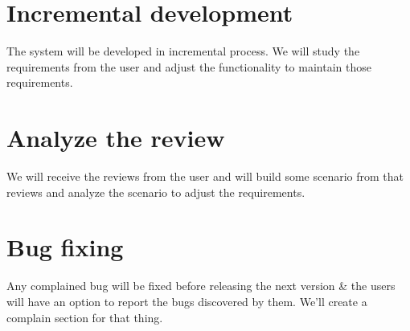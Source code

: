 \documentclass{scrreprt}
\begin{document}
\section{Incremental development}
The system will be developed in incremental process. We will study the requirements from the user and adjust the functionality to maintain those requirements.
\section{Analyze the review}
We will receive the  reviews from the user and will build some scenario from that reviews and analyze the scenario to adjust the requirements.

\section{Bug fixing}
Any complained bug will be fixed before releasing the next version \& the users will have an option to report the bugs discovered by them. We'll create a complain section for that thing.

\end{document}
